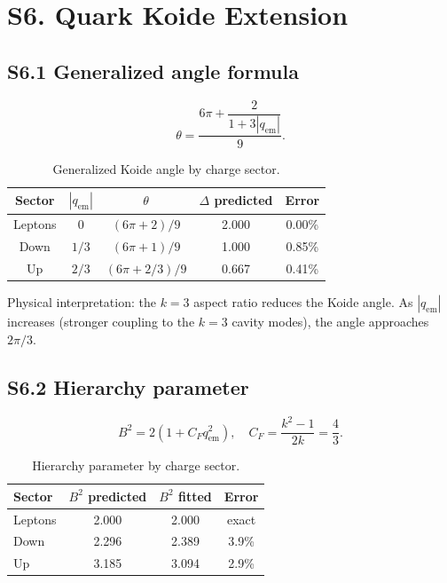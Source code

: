 \documentclass[11pt,a4paper]{article}
\begin{document}
\section{S6. Quark Koide Extension}
\label{sec:S6}

\subsection{S6.1 Generalized angle formula}

\begin{equation}
  \theta = \frac{6\pi + \dfrac{2}{1 + 3|q_{\text{em}}|}}{9}.
\end{equation}

\begin{table}[h]
\centering
\begin{tabular}{@{}ccccc@{}}
\toprule
Sector & $|q_{\text{em}}|$ & $\theta$ & $\Delta$ predicted & Error \\
\midrule
Leptons & 0 & $(6\pi+2)/9$ & 2.000 & 0.00\% \\
Down & $1/3$ & $(6\pi+1)/9$ & 1.000 & 0.85\% \\
Up & $2/3$ & $(6\pi+2/3)/9$ & 0.667 & 0.41\% \\
\bottomrule
\end{tabular}
\caption{Generalized Koide angle by charge sector.}
\label{tab:quark-koide}
\end{table}

Physical interpretation: the $k=3$ aspect ratio reduces the Koide angle. As $|q_{\text{em}}|$ increases (stronger coupling to the $k=3$ cavity modes), the angle approaches $2\pi/3$.

\subsection{S6.2 Hierarchy parameter}

\begin{equation}
  B^2 = 2(1 + C_F q_{\text{em}}^2), \quad C_F = \frac{k^2 - 1}{2k} = \frac{4}{3}.
\end{equation}

\begin{table}[h]
\centering
\begin{tabular}{@{}lccc@{}}
\toprule
Sector & $B^2$ predicted & $B^2$ fitted & Error \\
\midrule
Leptons & 2.000 & 2.000 & exact \\
Down & 2.296 & 2.389 & 3.9\% \\
Up & 3.185 & 3.094 & 2.9\% \\
\bottomrule
\end{tabular}
\caption{Hierarchy parameter by charge sector.}
\label{tab:hierarchy}
\end{table}
\end{document}
